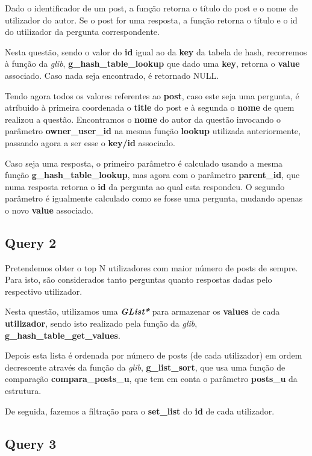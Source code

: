\documentclass[a4paper]{article}
\begin{document}
Dado o identificador de um post, a função retorna o título do post 
e o nome de utilizador do autor. Se o post for uma resposta, a função
retorna o título e o id do utilizador da pergunta correspondente.

Nesta questão, sendo o valor do \textbf{id} igual ao da \textbf{key} 
da tabela de hash, recorremos à função da \textit{glib},
\textbf{g\_hash\_table\_lookup} que dado uma \textbf{key},
retorna o \textbf{value} associado. Caso nada seja encontrado,
é retornado NULL.

Tendo agora todos os valores referentes ao \textbf{post}, caso este
seja uma pergunta, é atríbuido à primeira coordenada o \textbf{title}
do post e à segunda o \textbf{nome} de quem realizou a questão.
Encontramos o \textbf{nome} do autor da questão invocando o parâmetro
\textbf{owner\_user\_id} na mesma função \textbf{lookup} utilizada 
anteriormente, passando agora a ser esse o \textbf{key/id} associado.

Caso seja uma resposta, o primeiro parâmetro é calculado usando a mesma 
função \textbf{g\_hash\_table\_lookup}, mas agora com o 
parâmetro \textbf{parent\_id}, que numa resposta retorna o \textbf{id} 
da pergunta ao qual esta respondeu. O segundo parâmetro é igualmente
calculado como se fosse uma pergunta, mudando apenas o novo 
\textbf{value} associado.

\subsection{Query 2}

Pretendemos obter o top N utilizadores com maior número de posts de 
sempre. Para isto, são considerados tanto perguntas quanto respostas 
dadas pelo respectivo utilizador.

Nesta questão, utilizamos uma \textit{\textbf{GList*}} para armazenar 
os \textbf{values} de cada \textbf{utilizador}, sendo isto realizado
pela função da \textit{glib}, \textbf{g\_hash\_table\_get\_values}.

Depois esta lista é ordenada por número de posts (de cada utilizador)
em ordem decrescente através da função da \textit{glib}, 
\textbf{g\_list\_sort}, que usa uma função de comparação 
\textbf{compara\_posts\_u}, que tem em conta o parâmetro
\textbf{posts\_u} da estrutura.

De seguida, fazemos a filtração para o \textbf{set\_list} do 
\textbf{id} de cada utilizador.

\subsection{Query 3}
\end{document}
